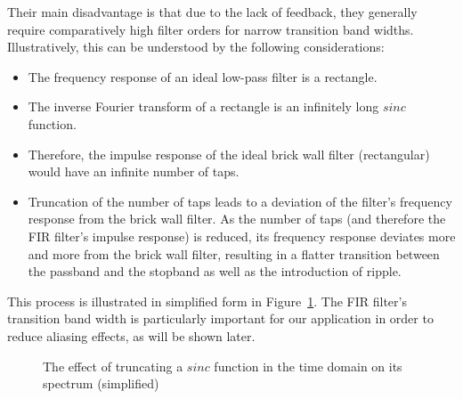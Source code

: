 Their  main  disadvantage   is  that  due  to  the  lack   of  feedback,  they
generally require comparatively high filter  orders for narrow transition band
widths. Illustratively, this can be understood by the following considerations:
\begin{itemize}\tightlist
    \item
        The frequency response of an ideal low-pass filter is a rectangle.
    \item
        The inverse  Fourier transform  of a rectangle  is an  infinitely long
        $sinc$ function.
    \item
        Therefore,  the  impulse  response  of the  ideal  brick  wall  filter
        (rectangular) would have an infinite number of taps.
    \item
        Truncation of the number of taps  leads to a deviation of the filter's
        frequency response from the brick wall  filter.  As the number of taps
        (and  therefore the  FIR filter's  impulse response)  is reduced,  its
        frequency response deviates more and  more from the brick wall filter,
        resulting  in  a  flatter  transition between  the  passband  and  the
        stopband as well as the introduction of ripple.
\end{itemize}
This     process     is     illustrated      in     simplified     form     in
Figure~\ref{fig:brick_wall_vs_FIR}.  The FIR filter's transition band width is
particularly  important  for  our  application in  order  to  reduce  aliasing
effects, as will be shown later.

\begin{figure}
    \centering
    
    \caption[Brick Wall Filter vs. FIR Filter (simplified)]{%
        The effect of  truncating a $sinc$ function in the  time domain on its
        spectrum (simplified)%
    }
    \label{fig:brick_wall_vs_FIR}
\end{figure}

